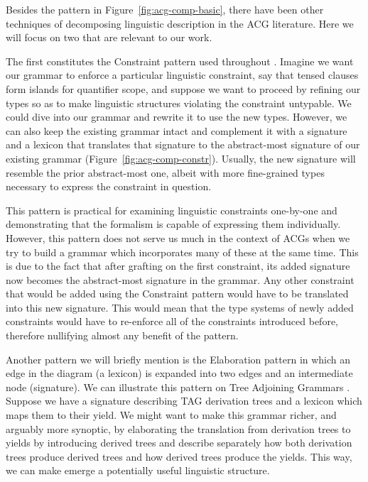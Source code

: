 \documentclass{llncs}
\begin{document}
Besides the pattern in Figure~\ref{fig:acg-comp-basic}, there have been other
techniques of decomposing linguistic description in the ACG literature. Here
we will focus on two that are relevant to our work.

The first constitutes the Constraint pattern used throughout
\cite{pogodalla2012controlling}. Imagine we want our grammar to enforce a
particular linguistic constraint, say that tensed clauses form islands for
quantifier scope, and suppose we want to proceed by refining our types so as
to make linguistic structures violating the constraint untypable. We could
dive into our grammar and rewrite it to use the new types. However, we can
also keep the existing grammar intact and complement it with a signature and a
lexicon that translates that signature to the abstract-most signature of our
existing grammar (Figure~\ref{fig:acg-comp-constr}). Usually, the new
signature will resemble the prior abstract-most one, albeit with more
fine-grained types necessary to express the constraint in question.

This pattern is practical for examining linguistic constraints one-by-one and
demonstrating that the formalism is capable of expressing them
individually. However, this pattern does not serve us much in the context of
ACGs when we try to build a grammar which incorporates many of these at the
same time. This is due to the fact that after grafting on the first
constraint, its added signature now becomes the abstract-most signature in the
grammar. Any other constraint that would be added using the Constraint pattern
would have to be translated into this new signature. This would mean that the
type systems of newly added constraints would have to re-enforce all of the
constraints introduced before, therefore nullifying almost any benefit of the
pattern.

Another pattern we will briefly mention is the Elaboration pattern in which an
edge in the diagram (a lexicon) is expanded into two edges and an intermediate
node (signature). We can illustrate this pattern on Tree Adjoining Grammars
\cite{degroote02}. Suppose we have a signature describing TAG derivation trees
and a lexicon which maps them to their yield. We might want to make this
grammar richer, and arguably more synoptic, by elaborating the translation
from derivation trees to yields by introducing derived trees and describe
separately how both derivation trees produce derived trees and how derived
trees produce the yields. This way, we can make emerge a potentially useful
linguistic structure.
\end{document}
